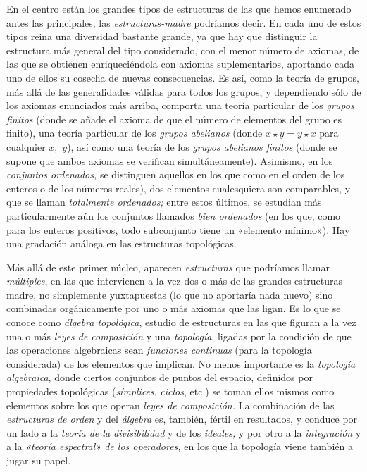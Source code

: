 \documentclass[a4paper, 12pt, draft]{article}
\begin{document}
En el centro están los grandes tipos de estructuras de las que hemos enumerado antes las principales, las \textit{estructuras-madre} podríamos decir. En cada uno de estos tipos reina una diversidad bastante grande, ya que hay que distinguir la estructura más general del tipo considerado, con el menor número de axiomas, de las que se obtienen enriqueciéndola con axiomas suplementarios, aportando cada uno de ellos su cosecha de nuevas consecuencias. Es así, como la teoría de grupos, más allá de las generalidades válidas para todos los grupos, y dependiendo sólo de los axiomas enunciados más arriba, comporta una teoría particular de los \textit{grupos finitos} (donde se añade el axioma de que el número de elementos del grupo es finito), una teoría particular de los \textit{grupos abelianos} (donde $x\star y=y\star x$ para cualquier \mbox{$x$, $y$}), así como una teoría de los \textit{grupos abelianos finitos} (donde se supone que ambos axiomas se verifican simultáneamente). Asimismo, en los \textit{conjuntos ordenados,} se distinguen aquellos en los que como en el orden de los enteros o de los números reales), dos elementos cualesquiera son comparables, y que se llaman \textit{totalmente ordenados;} entre estos últimos, se estudian más particularmente aún los conjuntos llamados \textit{bien ordenados} (en los que, como para los enteros positivos, todo subconjunto tiene un «elemento mínimo»). Hay una gradación análoga en las estructuras topológicas. 

 

 Más allá de este primer núcleo, aparecen \textit{estructuras} que podríamos llamar \textit{múltiples}, en las que intervienen a la vez dos o más de las grandes estructuras-madre, no simplemente yuxtapuestas (lo que no aportaría nada nuevo) sino combinadas orgánicamente por uno o más axiomas que las ligan. Es lo que se conoce como \textit{álgebra topológica}, estudio de estructuras en las que figuran a la vez una o más \textit{leyes de composición} y una \textit{topología}, ligadas por la condición de que las operaciones algebraicas sean \textit{funciones continuas} (para la topología considerada) de los elementos que implican. No menos importante es la \textit{topología algebraica}, donde ciertos conjuntos de puntos del espacio, definidos por propiedades topológicas (\textit{símplices}, \textit{ciclos}, etc.) se toman ellos mismos como elementos sobre los que operan \textit{leyes de composición.} La combinación de las \textit{estructuras de orden} y del \textit{álgebra} es, también, fértil en resultados, y conduce por un lado a la \textit{teoría de la divisibilidad} y de los \textit{ideales,} y por otro a la \textit{integración} y a la \textit{«teoría espectral» de los operadores,} en los que la topología viene también a jugar su papel.
\end{document}

